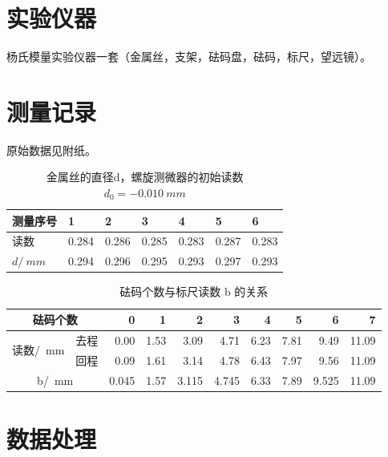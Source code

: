 \documentclass{article}
\begin{document}
\section*{实验仪器}
杨氏模量实验仪器一套（金属丝，支架，砝码盘，砝码，标尺，望远镜）。

\section*{测量记录}
原始数据见附纸。
\begin{table}[htbp]
    \centering
    \caption{金属丝的直径d，螺旋测微器的初始读数 $d_0=\SI{-0.010}{mm}$}
    \begin{tabular}{|l|l|l|l|l|l|l|}
        \hline
        测量序号          & 1     & 2     & 3     & 4     & 5     & 6    \bigstrut  \\
        \hline
        读数            & 0.284 & 0.286 & 0.285 & 0.283 & 0.287 & 0.283 \bigstrut \\
        \hline
        $d/\SI{}{mm}$ & 0.294 & 0.296 & 0.295 & 0.293 & 0.297 & 0.293 \bigstrut \\
        \hline
    \end{tabular}
\end{table}

\begin{table}[htbp]
    \centering
    \caption{砝码个数与标尺读数 b 的关系}
    \begin{tabular}{|cc|r|r|r|r|r|r|r|r|}
        \hline
        \multicolumn{2}{|c|}{砝码个数}                             & 0                       & 1 & 2 & 3 & 4 & 5 & 6 & 7 \bigstrut             \\
        \hline
        \multicolumn{1}{|r|}{\multirow{2}[4]{*}{读数/\SI{}{mm}}} & \multicolumn{1}{l|}{去程} &0.00   &1.53   &3.09   & 4.71  & 6.23  & 7.81  &  9.49           &11.09 \bigstrut \\
        \cline{2-10}    \multicolumn{1}{|r|}{}                 & \multicolumn{1}{l|}{回程} & 0.09  & 1.61  &  3.14 & 4.78  & 6.43  & 7.97  &       9.56      & 11.09\bigstrut \\
        \hline
        \multicolumn{2}{|c|}{b/\SI{}{mm}}                                                   & 0.045 & 1.57 &  3.115 &  4.745 &  6.33 & 7.89 & 9.525 &11.09 \bigstrut               \\
        \hline
    \end{tabular}
\end{table}

\section*{数据处理}
\end{document}
